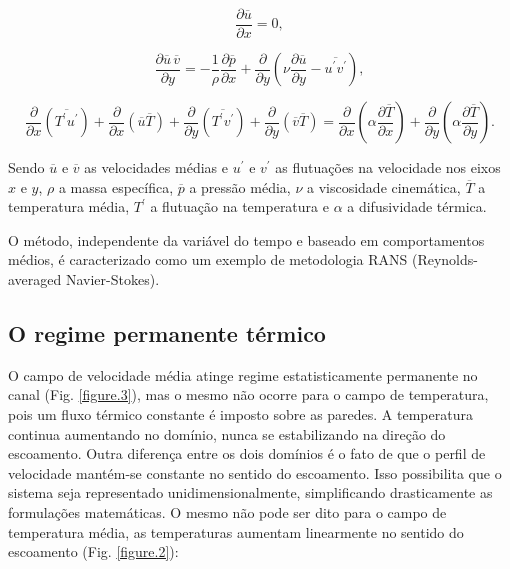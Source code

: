 \begin{equation}\label{mass}
\frac{\partial \overline{u}}{\partial x} = 0,
\end{equation}

\begin{equation}\label{dynamics}
\frac{\partial \overline{u} \, \overline{v}}{\partial y} = 
- \frac{1}{\rho} \frac{\partial \overline{p}}{\partial x} + \frac{\partial}{\partial y}\left(\nu \frac{\partial \overline{u}}{\partial y} - \overline{u^\prime v^\prime}\right),
\end{equation}


\begin{equation}\label{energy permanent}
\frac{\partial{}}{\partial{x}} \left(\overline{T^\prime u^\prime}\right) + \frac{\partial{}}{\partial{x}}\left(\overline{u} \overline{T}\right)     + 
\frac{\partial{}}{\partial{y}} \left(\overline{T^\prime v^\prime}\right) + \frac{\partial{}}{\partial{y}}\left(\overline{v} \overline{T}\right) 
=
{\frac{\partial{}}{\partial{x}}} \left(\alpha {\frac{\partial{\overline{T}}}{\partial{x}}} \right) +
{\frac{\partial{}}{\partial{y}}} \left(\alpha {\frac{\partial{\overline{T}}}{\partial{y}}} \right). 
\end{equation}

Sendo $\overline{u}$ e $\overline{v}$ as velocidades médias e $u^\prime$ e $v^\prime$ as flutuações na velocidade nos eixos $x$ e $y$, $\rho$ a massa específica, $\overline{p}$ a pressão média, $\nu$ a viscosidade cinemática, $\overline{T}$ a temperatura média, $T^\prime$ a flutuação na temperatura e $\alpha$ a difusividade térmica.

O método, independente da variável do tempo e baseado em comportamentos médios, é caracterizado como um exemplo de metodologia RANS (Reynolds-averaged Navier-Stokes).


\subsection{O regime permanente térmico}

O campo de velocidade média atinge regime estatisticamente permanente no canal (Fig. \ref{figure.3}), mas o mesmo não ocorre para o campo de temperatura, pois um fluxo térmico constante é imposto sobre as paredes. A temperatura continua aumentando no domínio, nunca se estabilizando na direção do escoamento.
Outra diferença entre os dois domínios é o fato de que o perfil de velocidade mantém-se constante no sentido do escoamento. Isso possibilita que o sistema seja representado unidimensionalmente, simplificando drasticamente as formulações matemáticas. O mesmo não pode ser dito para o campo de temperatura média, as temperaturas aumentam linearmente no sentido do escoamento (Fig. \ref{figure.2}):

